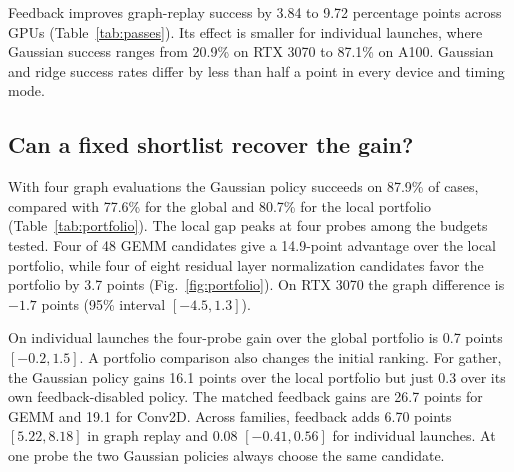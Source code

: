 \documentclass[conference]{IEEEtran}
\begin{document}
Feedback improves graph-replay success by 3.84 to 9.72 percentage
points across GPUs (Table~\ref{tab:passes}). Its effect is smaller for
individual launches, where Gaussian success ranges from 20.9\% on RTX
3070 to 87.1\% on A100. Gaussian and ridge success rates differ by less
than half a point in every device and timing mode.

\begin{table}[t]
\centering
\caption{Five-GPU independent-pass success (\%) after four evaluations. On and
Off denote the Gaussian surrogate with measured feedback enabled and
disabled. Ridge uses adaptive geometry ridge.}
\label{tab:passes}
\footnotesize\setlength{\tabcolsep}{3pt}

\end{table}

\subsection{Can a fixed shortlist recover the gain?}
With four graph evaluations the Gaussian policy succeeds on 87.9\% of
cases, compared with 77.6\% for the global and 80.7\% for the local
portfolio (Table~\ref{tab:portfolio}). The local gap peaks at four
probes among the budgets tested. Four of 48 GEMM candidates give
a 14.9-point advantage over the local portfolio, while four of eight
residual layer normalization candidates favor the portfolio by 3.7 points
(Fig.~\ref{fig:portfolio}). On RTX 3070 the graph difference is
$-1.7$ points (95\% interval $[-4.5,1.3]$).

On individual launches the four-probe gain over the global portfolio is
0.7 points $[-0.2,1.5]$. A portfolio comparison also changes the initial ranking.
For gather, the Gaussian policy gains 16.1 points over the local
portfolio but just 0.3 over its own feedback-disabled policy. The
matched feedback gains are 26.7 points for GEMM and 19.1 for Conv2D.
Across families, feedback adds 6.70 points $[5.22,8.18]$ in graph
replay and 0.08 $[-0.41,0.56]$ for individual launches. At one probe
the two Gaussian policies always choose the same candidate.

\begin{table}[t]
\centering
\caption{Five-GPU independent-pass success (\%). Global and Local are
fixed portfolios. The paired difference (points) compares Gaussian with
Local. Each budget measures distinct configurations.}
\label{tab:portfolio}
\footnotesize\setlength{\tabcolsep}{3pt}

\end{table}
\end{document}
